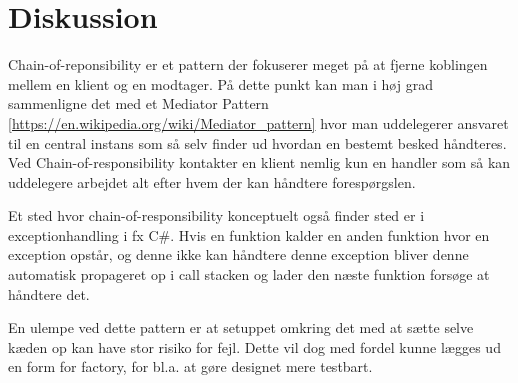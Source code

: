 \chapter{Diskussion}
Chain-of-reponsibility er et pattern der fokuserer meget på at fjerne koblingen mellem en klient og en modtager. På dette punkt kan man i høj grad sammenligne det med et Mediator Pattern \ref{https://en.wikipedia.org/wiki/Mediator_pattern} hvor man uddelegerer ansvaret til en central instans som så selv finder ud hvordan en bestemt besked håndteres.
Ved Chain-of-responsibility kontakter en klient nemlig kun en handler som så kan uddelegere arbejdet alt efter hvem der kan håndtere forespørgslen.

Et sted hvor chain-of-responsibility konceptuelt også finder sted er i exceptionhandling i fx C#. Hvis en funktion kalder en anden funktion hvor en exception opstår, og denne ikke kan håndtere denne exception bliver denne automatisk propageret op i call stacken og lader den næste funktion forsøge at håndtere det. 

En ulempe ved dette pattern er at setuppet omkring det med at sætte selve kæden op kan have stor risiko for fejl. Dette vil dog med fordel kunne lægges ud en form for factory, for bl.a. at gøre designet mere testbart.